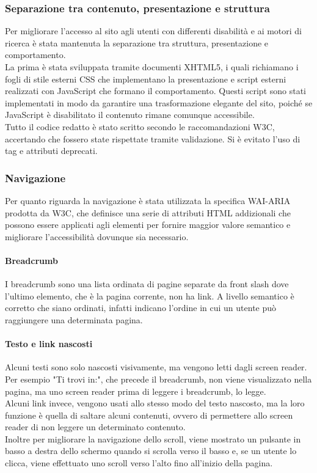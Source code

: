 \subsubsection{Separazione tra contenuto, presentazione e struttura}
Per migliorare l’accesso al sito agli utenti con differenti disabilità e ai motori di ricerca è stata mantenuta la separazione tra struttura, presentazione e comportamento.\\
La prima è stata sviluppata tramite documenti XHTML5, i quali richiamano i fogli di stile esterni CSS che implementano la presentazione e script esterni realizzati con JavaScript che formano il comportamento. Questi script sono stati implementati in modo da garantire una trasformazione elegante del sito, poiché se JavaScript è disabilitato il contenuto rimane comunque accessibile.\\
Tutto il codice redatto è stato scritto secondo le raccomandazioni W3C, accertando che fossero state rispettate tramite validazione. Si è evitato l’uso di tag e attributi deprecati.

\subsubsection{Navigazione} \label{subsection:navigazione}
Per quanto riguarda la navigazione è stata utilizzata la specifica WAI-ARIA prodotta da W3C, che definisce una serie di attributi HTML addizionali che possono essere applicati agli elementi per fornire maggior valore semantico e migliorare l'accessibilità dovunque sia necessario.

\paragraph{Breadcrumb} I breadcrumb sono una lista ordinata di pagine separate da front slash dove l'ultimo elemento, che è la pagina corrente, non ha link. A livello semantico è corretto che siano ordinati, infatti indicano l'ordine in cui un utente può raggiungere una determinata pagina.

\paragraph{Testo e link nascosti} Alcuni testi sono solo nascosti visivamente, ma vengono letti dagli screen reader. Per esempio "Ti trovi in:", che precede il breadcrumb, non viene visualizzato nella pagina, ma uno screen reader prima di leggere i breadcrumb, lo legge.\\
Alcuni link invece, vengono usati allo stesso modo del testo nascosto, ma la loro funzione è quella di saltare alcuni contenuti, ovvero di permettere allo screen reader di non leggere un determinato contenuto.\\
Inoltre per migliorare la navigazione dello scroll, viene mostrato un pulsante in basso a destra dello schermo quando si scrolla verso il basso e, se un utente lo clicca, viene effettuato uno scroll verso l'alto fino all'inizio della pagina.

